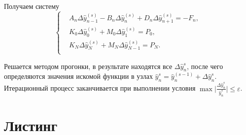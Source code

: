 \documentclass[a4paper,oneside,12pt]{extreport}
\begin{document}
\begin{enumerate}
	Получаем систему
	\begin{equation}
		\left\{
		\begin{aligned}
			&A_n\Delta\widehat y_{n-1}^{(s)}-B_n\Delta\widehat y_{n}^{(s)}+D_n\Delta\widehat y_{n+1}^{(s)}=-F_n,\\
			&K_0\Delta\widehat y_{0}^{(s)}+M_0\Delta\widehat y_{1}^{(s)}=P_0,\\
			&K_N\Delta\widehat y_{N}^{(s)}+M_N\Delta\widehat y_{N-1}^{(s)}=P_N.\\
		\end{aligned}
		\right.
	\end{equation}

	Решается методом прогонки, в результате находятся все $\Delta \widehat y_n^s$, после чего определяются значения искомой функции в узлах $ \widehat y_n^s= \widehat y_n^{(s-1)}+\Delta \widehat y_n^s $.
	Итерационный процесс заканчивается при выполнении условия $\displaystyle \max\bigg|\frac{\Delta \widehat y_n^s}{\widehat y_n^s}\bigg|\leqslant\varepsilon$.
\end{enumerate}

\pagebreak
\section*{Листинг}












\end{document}
